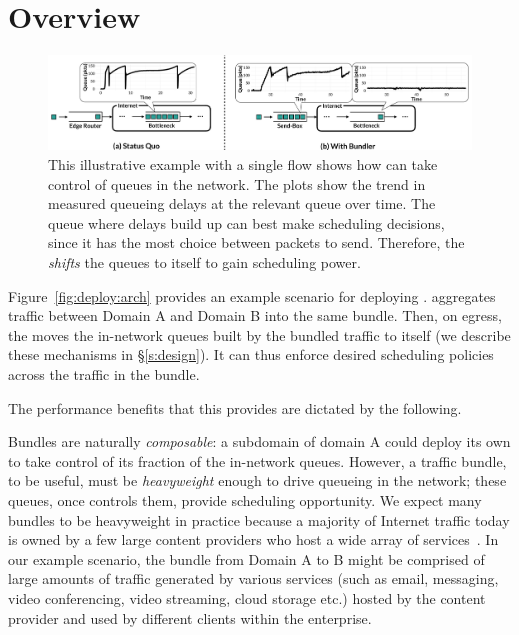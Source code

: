 \section{Overview}\label{s:deploy}
\begin{figure}[t]
    \centering
    \includegraphics[width=\textwidth]{img/shift-bottleneck-combined}
    \caption{This illustrative example with a single flow shows how \name can take control of queues in the network. The plots show the trend in measured queueing delays at the relevant queue over time. The queue where delays build up can best make scheduling decisions, since it has the most choice between packets to send. Therefore, the \inbox \emph{shifts} the queues to itself to gain scheduling power.}\label{fig:design:shift-bottleneck}
\end{figure}
%


Figure~\ref{fig:deploy:arch} provides an example scenario for deploying \name. 
\name aggregates traffic between Domain A and Domain B into the same bundle. 
Then, on egress, the \inbox moves the in-network queues built by the bundled traffic to itself (we describe these mechanisms in \S\ref{s:design}). 
It can thus enforce desired scheduling policies across the traffic in the bundle.

The performance benefits that this provides are dictated by the following.

Bundles are naturally \emph{composable}: a subdomain of domain A could deploy its own \name to take control of its fraction of the in-network queues.
However, a traffic bundle, to be useful, must be \emph{heavyweight} enough to drive queueing in the network; these queues, once \name controls them, provide scheduling opportunity.
We expect many bundles to be heavyweight in practice because a majority of Internet traffic today is owned by a few large content providers who host a wide array of services~\cite{fivecomps, labovitz}. 
In our example scenario, the bundle from Domain A to B might be comprised of large amounts of traffic generated by various services (such as email, messaging, video conferencing, video streaming, cloud storage etc.) hosted by the content provider and used by different clients within the enterprise.

